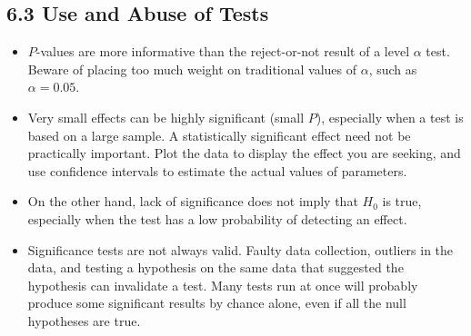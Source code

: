 	\subsection{6.3 Use and Abuse of Tests}
		\begin{itemize}
			 \item $P$-values are more informative than the reject-or-not result of a level $\alpha$ test. Beware of placing too much weight on traditional values of $\alpha$, such as $\alpha = 0.05$.
			
			\item Very small effects can be highly significant (small $P$), especially when a test is based on a large sample. A statistically significant effect need not be practically important. Plot the data to display the effect you are seeking, and use confidence intervals to estimate the actual values of parameters.
			
			\item On the other hand, lack of significance does not imply that $H_0$ is true, especially when the test has a low probability of detecting an effect.
			
			\item Significance tests are not always valid. Faulty data collection, outliers in the data, and testing a hypothesis on the same data that suggested the hypothesis can invalidate a test. Many tests run at once will probably produce some significant results by chance alone, even if all the null hypotheses are true.
		\end{itemize}
